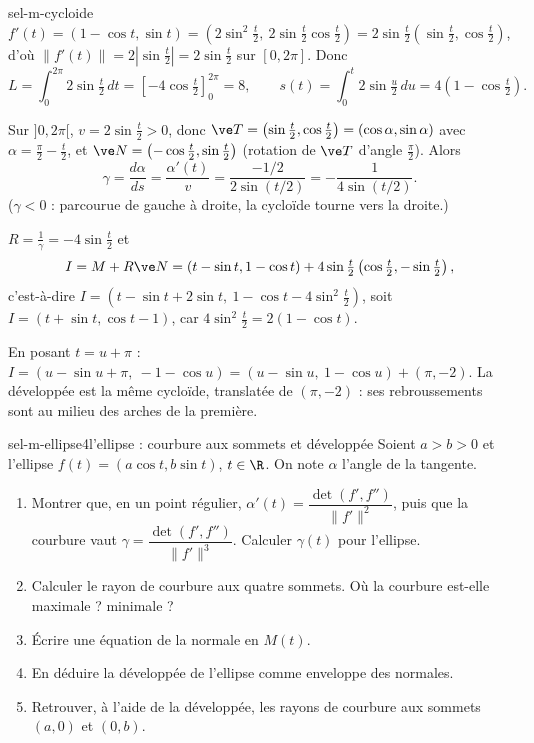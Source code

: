 \begin{corrige}{sel-m-cycloide}
 $f'(t)=(1-\cos t,\sin t)=\left(2\sin^2\tfrac t2,\ 2\sin\tfrac t2\cos\tfrac t2\right)=2\sin\tfrac t2\left(\sin\tfrac t2,\cos\tfrac t2\right)$, d'où $\|f'(t)\|=2\left|\sin\frac t2\right|=2\sin\frac t2$ sur $[0,2\pi]$. Donc
\[L=\int_0^{2\pi}2\sin\tfrac t2\,dt=\left[-4\cos\tfrac t2\right]_0^{2\pi}=8,\qquad s(t)=\int_0^t2\sin\tfrac u2\,du=4\left(1-\cos\tfrac t2\right).\]

 Sur $]0,2\pi[$, $v=2\sin\frac t2>0$, donc $\ve T=\left(\sin\frac t2,\cos\frac t2\right)=(\cos\alpha,\sin\alpha)$ avec $\alpha=\frac\pi2-\frac t2$, et $\ve N=\left(-\cos\frac t2,\sin\frac t2\right)$ (rotation de $\ve T$ d'angle $\frac\pi2$). Alors
\[\gamma=\frac{d\alpha}{ds}=\frac{\alpha'(t)}{v}=\frac{-1/2}{2\sin(t/2)}=-\frac1{4\sin(t/2)}.\]
($\gamma<0$ : parcourue de gauche à droite, la cycloïde tourne vers la droite.)

 $R=\frac1\gamma=-4\sin\frac t2$ et
\[I=M+R\ve N=(t-\sin t,1-\cos t)+4\sin\tfrac t2\left(\cos\tfrac t2,-\sin\tfrac t2\right),\]
c'est-à-dire $I=\left(t-\sin t+2\sin t,\ 1-\cos t-4\sin^2\frac t2\right)$,
soit $I=(t+\sin t,\cos t-1)$, car $4\sin^2\frac t2=2(1-\cos t)$.

 En posant $t=u+\pi$ : $I=(u-\sin u+\pi,\ -1-\cos u)=(u-\sin u,\ 1-\cos u)+(\pi,-2)$. La développée est la même cycloïde, translatée de $(\pi,-2)$ : ses rebroussements sont au milieu des arches de la première.
\end{corrige}

\begin{exo}{sel-m-ellipse}{4}{l'ellipse : courbure aux sommets et développée}
Soient $a>b>0$ et l'ellipse $f(t)=(a\cos t,b\sin t)$, $t\in\R$. On note $\alpha$ l'angle de la tangente.
\begin{enumerate}
\item Montrer que, en un point régulier, $\alpha'(t)=\dfrac{\det(f',f'')}{\|f'\|^2}$, puis que la courbure vaut $\gamma=\dfrac{\det(f',f'')}{\|f'\|^3}$. Calculer $\gamma(t)$ pour l'ellipse.
\item Calculer le rayon de courbure aux quatre sommets. Où la courbure est-elle maximale ? minimale ?
\item Écrire une équation de la normale en $M(t)$.
\item En déduire la développée de l'ellipse comme enveloppe des normales.
\item Retrouver, à l'aide de la développée, les rayons de courbure aux sommets $(a,0)$ et $(0,b)$.
\end{enumerate}
\end{exo}

